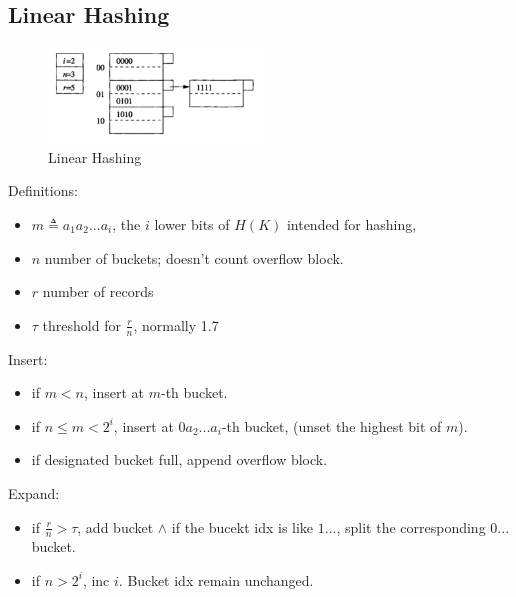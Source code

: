 \documentclass[a4paper]{report}
\begin{document}
\subsection{Linear Hashing}
\begin{figure}[H]
        \centerline{\includegraphics[height = 1in]{img/linearhashing}}
        \caption{Linear Hashing}
    \label{fig:linearHashing}
\end{figure}
Definitions:
\begin{itemize}
\item $m \triangleq a_1a_2...a_i$, the $i$ lower bits of $H(K)$ intended for hashing,
\item $n$ number of buckets; doesn't count overflow block. 
\item $r$ number of records
\item $\tau$ threshold for $\frac{r}{n}$, normally 1.7 
\end{itemize}
Insert: 
\begin{itemize}
\item if $m<n$, insert at $m$-th bucket.
\item if $n\leq m < 2^i$, insert at $0a_2...a_i$-th bucket, (unset the highest bit of $m$).
\item if designated bucket full, append overflow block. 
\end{itemize}
Expand:
\begin{itemize}
\item if $\frac{r}{n}>\tau$, add bucket $\wedge$ if the bucekt idx is like $1...$, split the corresponding $0...$ bucket. 
\item if $n>2^i$, inc $i$. Bucket idx remain unchanged. 
\end{itemize}
\end{document}
